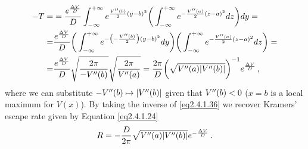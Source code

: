 \documentclass[../main.tex]{subfiles}
\begin{document}
\begin{align}
     -T =&  = \frac{e^{\frac{\Delta V}{D}}}{D}\int_{-\infty}^{+\infty}e^{\frac{V''(b)}{2}(y-b)^{2}}\bigg(\int_{-\infty}^{+\infty}e^{-\frac{V''(a)}{2}(z-a)^{2}}dz\bigg)dy = \nonumber \\
        =& \frac{e^{\frac{\Delta V}{D}}}{D}\bigg(\int_{-\infty}^{+\infty}e^{-\big(-\frac{V''(b)}{2}\big)(y-b)^{2}}dy\bigg)\bigg(\int_{-\infty}^{+\infty}e^{-\frac{V''(a)}{2}(z-a)^{2}}dz\bigg) = \nonumber \\
        =& \frac{e^{\frac{\Delta V}{D}}}{D}\sqrt{\frac{2\pi}{-V''(b)}}\sqrt{\frac{2\pi}{V''(a)}} = \frac{2\pi}{D}\bigg(\sqrt{V''(a)|V''(b)|}\bigg)^{-1}e^{\frac{\Delta V}{D}} \,, \label{eq2.4.1.36}
\end{align}
where we can substitute $-V''(b)\mapsto|V''(b)|$ given that $V''(b)<0$ ($x=b$ is a local maximum for $V(x)$).
By taking the inverse of \eqref{eq2.4.1.36} we recover Kramers' escape rate given by Equation \eqref{eq2.4.1.24}
\begin{equation*}
        R = -\frac{D}{2\pi}\sqrt{V''(a)|V''(b)|}e^{-\frac{\Delta V}{D}}\,.
\end{equation*}
\end{document}
